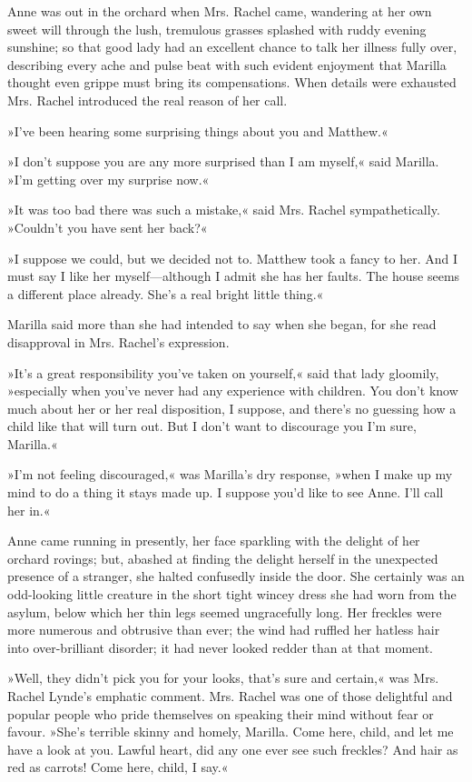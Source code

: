 Anne was out in the orchard when Mrs. Rachel came, wandering at her own sweet will through the lush, tremulous grasses splashed with ruddy evening sunshine; so that good lady had an excellent chance to talk her illness fully over, describing every ache and pulse beat with such evident enjoyment that Marilla thought even grippe must bring its compensations. When details were exhausted Mrs. Rachel introduced the real reason of her call.

»I've been hearing some surprising things about you and Matthew.«

»I don't suppose you are any more surprised than I am myself,« said Marilla. »I'm getting over my surprise now.«

»It was too bad there was such a mistake,« said Mrs. Rachel sympathetically. »Couldn't you have sent her back?«

»I suppose we could, but we decided not to. Matthew took a fancy to her. And I must say I like her myself—although I admit she has her faults. The house seems a different place already. She's a real bright little thing.«

Marilla said more than she had intended to say when she began, for she read disapproval in Mrs. Rachel's expression.

»It's a great responsibility you've taken on yourself,« said that lady gloomily, »especially when you've never had any experience with children. You don't know much about her or her real disposition, I suppose, and there's no guessing how a child like that will turn out. But I don't want to discourage you I'm sure, Marilla.«

»I'm not feeling discouraged,« was Marilla's dry response, »when I make up my mind to do a thing it stays made up. I suppose you'd like to see Anne. I'll call her in.«

Anne came running in presently, her face sparkling with the delight of her orchard rovings; but, abashed at finding the delight herself in the unexpected presence of a stranger, she halted confusedly inside the door. She certainly was an odd-looking little creature in the short tight wincey dress she had worn from the asylum, below which her thin legs seemed ungracefully long. Her freckles were more numerous and obtrusive than ever; the wind had ruffled her hatless hair into over-brilliant disorder; it had never looked redder than at that moment.

»Well, they didn't pick you for your looks, that's sure and certain,« was Mrs. Rachel Lynde's emphatic comment. Mrs. Rachel was one of those delightful and popular people who pride themselves on speaking their mind without fear or favour. »She's terrible skinny and homely, Marilla. Come here, child, and let me have a look at you. Lawful heart, did any one ever see such freckles? And hair as red as carrots! Come here, child, I say.«

